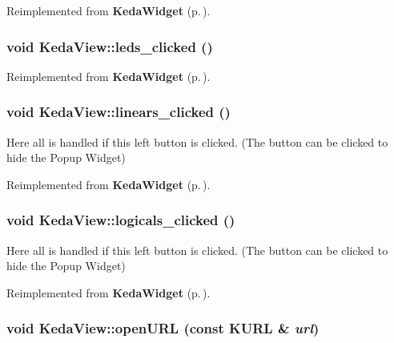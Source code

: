 Reimplemented from {\bf Keda\-Widget} {\rm (p.\,\pageref{classKedaWidget_141909bf5eb6fa869f7d3e1879ac7117})}.
\subsubsection{\setlength{\rightskip}{0pt plus 5cm}void Keda\-View::leds\_\-clicked ()\hspace{0.3cm}{\tt  [virtual, slot]}}\label{classKedaView_d18c177368f25e874e529bdb16cd4b0c}




Reimplemented from {\bf Keda\-Widget} {\rm (p.\,\pageref{classKedaWidget_d18c177368f25e874e529bdb16cd4b0c})}.
\subsubsection{\setlength{\rightskip}{0pt plus 5cm}void Keda\-View::linears\_\-clicked ()\hspace{0.3cm}{\tt  [virtual, slot]}}\label{classKedaView_27a772b8b32f712a4b741941174d5208}


Here all is handled if this left button is clicked. (The button can be clicked to hide the Popup Widget) 

Reimplemented from {\bf Keda\-Widget} {\rm (p.\,\pageref{classKedaWidget_27a772b8b32f712a4b741941174d5208})}.
\subsubsection{\setlength{\rightskip}{0pt plus 5cm}void Keda\-View::logicals\_\-clicked ()\hspace{0.3cm}{\tt  [virtual, slot]}}\label{classKedaView_3f77fa324bf367e751679cda8a8367db}


Here all is handled if this left button is clicked. (The button can be clicked to hide the Popup Widget) 

Reimplemented from {\bf Keda\-Widget} {\rm (p.\,\pageref{classKedaWidget_3f77fa324bf367e751679cda8a8367db})}.
\subsubsection{\setlength{\rightskip}{0pt plus 5cm}void Keda\-View::open\-URL (const KURL \& {\em url})\hspace{0.3cm}{\tt  [slot]}}\label{classKedaView_bd29ea8da04eb211ed2f5617c6ce1efb}


